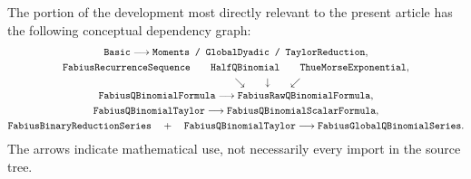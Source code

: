\documentclass[11pt,oneside]{article}
\theoremstyle{definition}
\theoremstyle{remark}
\begin{document}
The portion of the development most directly relevant to the present article
has the following conceptual dependency graph:
\begin{equation}\label{p3:eq:dependencygraph}
\begin{gathered}
 \texttt{Basic}
 \longrightarrow
 \texttt{Moments / GlobalDyadic / TaylorReduction},\\
 \texttt{FabiusRecurrenceSequence}
 \qquad
 \texttt{HalfQBinomial}
 \qquad
 \texttt{ThueMorseExponential},\\
 \hspace{2.2cm}\searrow\qquad\downarrow\qquad\swarrow\\[-0.2em]
 \texttt{FabiusQBinomialFormula}
 \longrightarrow
 \texttt{FabiusRawQBinomialFormula},\\
 \texttt{FabiusQBinomialTaylor}
 \longrightarrow
 \texttt{FabiusQBinomialScalarFormula},\\
 \texttt{FabiusBinaryReductionSeries}
 \quad+\quad
 \texttt{FabiusQBinomialTaylor}
 \longrightarrow
 \texttt{FabiusGlobalQBinomialSeries}.
\end{gathered}
\end{equation}
The arrows indicate mathematical use, not necessarily every import in the
source tree.
\end{document}
